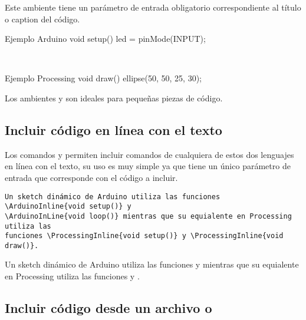 \documentclass[10pt,a4paper]{article}
\begin{document}
	Este ambiente tiene un parámetro de entrada obligatorio correspondiente al título o caption del código.
	\\
	
\begin{exampletwouptinynoframe}
\begin{ArduinoSketchBox}{Ejemplo Arduino}
void setup(){
  led = pinMode(INPUT);
}
\end{ArduinoSketchBox}
\end{exampletwouptinynoframe}
\\

\begin{exampletwouptinynoframe}
\begin{ProcessingSketchBox}{Ejemplo Processing}
void draw(){
  ellipse(50, 50, 25, 30);
}
\end{ProcessingSketchBox}
\end{exampletwouptinynoframe}

Los ambientes  y  son ideales para pequeñas piezas de código.

\subsection{Incluir código en línea con el texto}

Los comandos  y  permiten incluir comandos de cualquiera de estos dos lenguajes en línea con el texto, su uso es muy simple ya que tiene un único parámetro de entrada que corresponde con el código a incluir.

\begin{verbatim}
Un sketch dinámico de Arduino utiliza las funciones \ArduinoInline{void setup()} y 
\ArduinoInLine{void loop()} mientras que su equialente en Processing utiliza las
funciones \ProcessingInline{void setup()} y \ProcessingInline{void draw()}.
\end{verbatim}

Un sketch dinámico de Arduino utiliza las funciones  y  mientras que su equialente en Processing utiliza las funciones  y .

\subsection{Incluir código desde un archivo  o }
\end{document}
